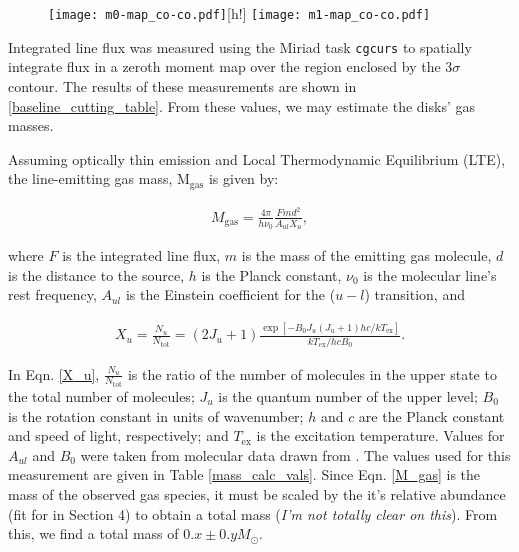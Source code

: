 \begin{figure}
\centering
\texttt{[image: m0-map\_co-co.pdf]}[h!]
  \label{fig:CO_m0}
  \texttt{[image: m1-map\_co-co.pdf]}
  \label{fig:CO_m1}
\end{figure}




Integrated line flux was measured using the Miriad task \texttt{cgcurs} to spatially integrate flux in a zeroth moment map over the region enclosed by the 3$\sigma$ contour. The results of these measurements are shown in \ref{baseline_cutting_table}. From these values, we may estimate the disks' gas masses.

Assuming optically thin emission and Local Thermodynamic Equilibrium (LTE), the line-emitting gas mass, M$_{\text{gas}}$ is given by:

\begin{align}
  M_{\text{gas}}= \frac{4 \pi}{h \nu_0} \frac{F m d^2}{A_{ul} X_u},
  \label{M_gas}
\end{align}

where $F$ is the integrated line flux, $m$ is the mass of the emitting gas molecule, $d$ is the distance to the source, $h$ is the Planck constant, $\nu_0$ is the molecular line's rest frequency, $A_{ul}$ is the Einstein coefficient for the ($u - l$) transition, and

\begin{align}
  X_u = \frac{N_u}{N_{\text{tot}}} = (2 J_u + 1) \frac{\exp [-B_0 J_u (J_u + 1) h c/kT_{\text{ex}}]}{kT_{\text{ex}}/hc B_0}.
  \label{X_u}
\end{align}

In Eqn. \ref{X_u}, $\frac{N_u}{N_{\text{tot}}}$ is the ratio of the number of molecules in the upper state to the total number of molecules; $J_u$ is the quantum number of the upper level; $B_0$ is the rotation constant in units of wavenumber; $h$ and $c$ are the Planck constant and speed of light, respectively; and $T_{\text{ex}}$ is the excitation temperature. Values for $A_{ul}$ and $B_0$ were taken from molecular data drawn from \citet{Schoeier2005}. The values used for this measurement are given in Table \ref{mass_calc_vals}. Since Eqn. \ref{M_gas} is the mass of the observed gas species, it must be scaled by the it's relative abundance (fit for in Section 4) to obtain a total mass (\textit{I'm not totally clear on this}). From this, we find a total mass of $0.x \pm 0.y M_{\odot}$.


